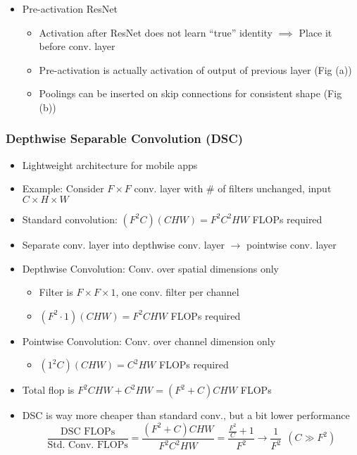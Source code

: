 \begin{itemize}
\begin{itemize}
    \end{itemize}
    \item Pre-activation ResNet
    \begin{itemize}
        \item Activation after ResNet does not learn ``true'' identity $\implies$ Place it before conv. layer
        \item Pre-activation is actually activation of output of previous layer (Fig (a))
        \item Poolings can be inserted on skip connections for consistent shape (Fig (b))
    \end{itemize}
    \begin{figures}
    \end{figures}
\end{itemize}

\subsubsection*{Depthwise Separable Convolution (DSC)}
\begin{itemize}
    \item Lightweight architecture for mobile apps
    \item Example: Consider $F\times F$ conv. layer with \# of filters unchanged, input $C\times H\times W$
    \item Standard convolution: $(F^2C)(CHW)=F^2C^2HW$ FLOPs required
    \item Separate conv. layer into depthwise conv. layer $\rightarrow$ pointwise conv. layer
    \item Depthwise Convolution: Conv. over spatial dimensions only
    \begin{itemize}
        \item Filter is $F\times F\times 1$, one conv. filter per channel
        \item $(F^2\cdot1)(CHW)=F^2CHW$ FLOPs required
    \end{itemize}
    \item Pointwise Convolution: Conv. over channel dimension only
    \begin{itemize}
        \item $(1^2C)(CHW)=C^2HW$ FLOPs required
    \end{itemize}
    \item Total flop is $F^2CHW+C^2HW=(F^2+C)CHW$ FLOPs
    \item DSC is way more cheaper than standard conv., but a bit lower performance
    \begin{equation}
        \frac{\text{DSC~FLOPs}}{\text{Std.~Conv.~FLOPs}}=\frac{(F^2+C)CHW}{F^2C^2HW}=\frac{\frac{F^2}{C}+1}{F^2}\to\frac{1}{F^2}~~(C\gg F^2)
    \end{equation}
\end{itemize}
\begin{figures}
\end{figures}
